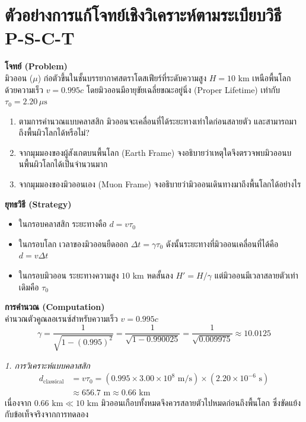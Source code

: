 \section{ตัวอย่างการแก้โจทย์เชิงวิเคราะห์ตามระเบียบวิธี P-S-C-T}

\begin{psctexample}
\textbf{โจทย์ (Problem)} \\
มิวออน ($\mu$) ก่อตัวขึ้นในชั้นบรรยากาศสตราโตสเฟียร์ที่ระดับความสูง $H = 10\text{ km}$ เหนือพื้นโลก ด้วยความเร็ว $v = 0.995c$ โดยมิวออนมีอายุขัยเฉลี่ยขณะอยู่นิ่ง (Proper Lifetime) เท่ากับ $\tau_0 = 2.20\,\mu\text{s}$ 
\begin{enumerate}
    \item ตามการคำนวณแบบคลาสสิก มิวออนจะเคลื่อนที่ได้ระยะทางเท่าใดก่อนสลายตัว และสามารถมาถึงพื้นผิวโลกได้หรือไม่?
    \item จากมุมมองของผู้สังเกตบนพื้นโลก (Earth Frame) จงอธิบายว่าเหตุใดจึงตรวจพบมิวออนบนพื้นผิวโลกได้เป็นจำนวนมาก
    \item จากมุมมองของมิวออนเอง (Muon Frame) จงอธิบายว่ามิวออนเดินทางมาถึงพื้นโลกได้อย่างไร
\end{enumerate}

\textbf{ยุทธวิธี (Strategy)} \\
\begin{itemize}
    \item ในกรอบคลาสสิก ระยะทางคือ $d = v \tau_0$
    \item ในกรอบโลก เวลาของมิวออนยืดออก $\Delta t = \gamma \tau_0$ ดังนั้นระยะทางที่มิวออนเคลื่อนที่ได้คือ $d = v \Delta t$
    \item ในกรอบมิวออน ระยะทางความสูง $10\text{ km}$ หดสั้นลง $H' = H / \gamma$ แต่มิวออนมีเวลาสลายตัวเท่าเดิมคือ $\tau_0$
\end{itemize}

\textbf{การคำนวณ (Computation)} \\
คำนวณตัวคูณลอเรนซ์สำหรับความเร็ว $v = 0.995c$
\begin{equation}
\gamma = \frac{1}{\sqrt{1 - (0.995)^2}} = \frac{1}{\sqrt{1 - 0.990025}} = \frac{1}{\sqrt{0.009975}} \approx 10.0125
\end{equation}

\textit{1. การวิเคราะห์แบบคลาสสิก}
\begin{align}
d_{\text{classical}} &= v \tau_0 = (0.995 \times 3.00 \times 10^8\text{ m/s}) \times (2.20 \times 10^{-6}\text{ s}) \nonumber \\
&\approx 656.7\text{ m} \approx 0.66\text{ km}
\end{align}
เนื่องจาก $0.66\text{ km} \ll 10\text{ km}$ มิวออนเกือบทั้งหมดจึงควรสลายตัวไปหมดก่อนถึงพื้นโลก ซึ่งขัดแย้งกับข้อเท็จจริงจากการทดลอง


\end{psctexample}
